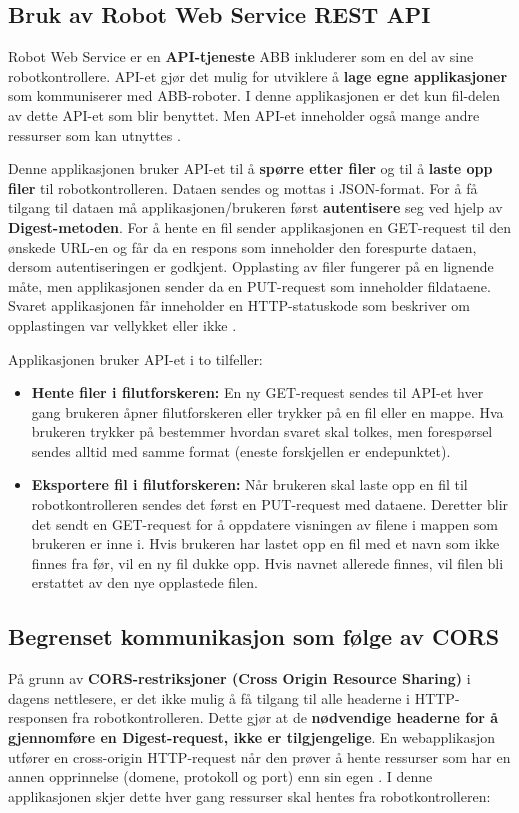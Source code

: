 \subsection{Bruk av Robot Web Service REST API}
Robot Web Service er en \textbf{API-tjeneste} ABB inkluderer som en del av sine robotkontrollere. API-et gjør det mulig for utviklere å \textbf{lage egne applikasjoner} som kommuniserer med ABB-roboter. I denne applikasjonen er det kun fil-delen av dette API-et som blir benyttet. Men API-et inneholder også mange andre ressurser som kan utnyttes \cite{RobotWebService}.

Denne applikasjonen bruker API-et til å \textbf{spørre etter filer} og til å \textbf{laste opp filer} til robotkontrolleren. Dataen sendes og mottas i JSON-format. For å få tilgang til dataen må applikasjonen/brukeren først \textbf{autentisere} seg ved hjelp av \textbf{Digest-metoden}.
For å hente en fil sender applikasjonen en GET-request til den ønskede URL-en og får da en respons som inneholder den forespurte dataen, dersom autentiseringen er godkjent.
Opplasting av filer fungerer på en lignende måte, men applikasjonen sender da en PUT-request som inneholder fildataene. Svaret applikasjonen får inneholder en HTTP-statuskode som beskriver om opplastingen var vellykket eller ikke \cite{APIDocs}.

Applikasjonen bruker API-et i to tilfeller:
\begin{itemize}
    \item \textbf{Hente filer i filutforskeren:} En ny GET-request sendes til API-et hver gang brukeren åpner filutforskeren eller trykker på en fil eller en mappe. Hva brukeren trykker på bestemmer hvordan svaret skal tolkes, men forespørsel sendes alltid med samme format (eneste forskjellen er endepunktet).
    \item \textbf{Eksportere fil i filutforskeren:} Når brukeren skal laste opp en fil til robotkontrolleren sendes det først en PUT-request med dataene. Deretter blir det sendt en GET-request for å oppdatere visningen av filene i mappen som brukeren er inne i. Hvis brukeren har lastet opp en fil med et navn som ikke finnes fra før, vil en ny fil dukke opp.  Hvis navnet allerede finnes, vil filen bli erstattet av den nye opplastede filen.
\end{itemize}

\subsection{Begrenset kommunikasjon som følge av CORS}
\label{corsRestrict}
På grunn av \textbf{CORS-restriksjoner (Cross Origin Resource Sharing)} i dagens nettlesere, er det ikke mulig å få tilgang til alle headerne i HTTP-responsen fra robotkontrolleren. Dette gjør at de \textbf{nødvendige headerne for å gjennomføre en Digest-request, ikke er tilgjengelige}. En webapplikasjon utfører en cross-origin HTTP-request når den prøver å hente ressurser som har en annen opprinnelse (domene, protokoll og port) enn sin egen \cite{CORS_request}. I denne applikasjonen skjer dette hver gang ressurser skal hentes fra robotkontrolleren:


